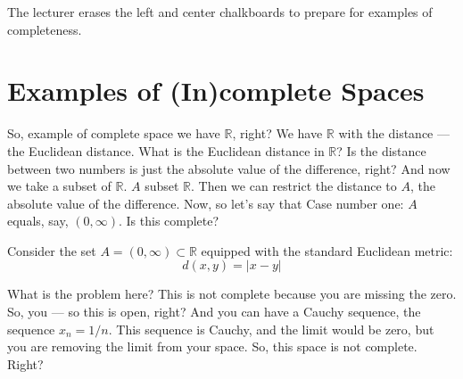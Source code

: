 \begin{meta-note}[Transition]
The lecturer erases the left and center chalkboards to prepare for examples of completeness.
\end{meta-note}

\section*{Examples of (In)complete Spaces}

\begin{spoken-clean}[00:04:05 - 00:05:24]
So, example of complete space we have $\mathbb{R}$, right? We have $\mathbb{R}$ with the distance --- the Euclidean distance.  What is the Euclidean distance in $\mathbb{R}$? Is the distance between two numbers is just the absolute value of the difference, right? And now we take a subset of $\mathbb{R}$. $A$ subset $\mathbb{R}$. Then we can restrict the distance to $A$, the absolute value of the difference. Now, so let's say that Case number one: $A$ equals, say, $(0, \infty)$. Is this complete?
\end{spoken-clean}

\begin{math-stroke}
Consider the set $A = (0, \infty) \subset \mathbb{R}$ equipped with the standard Euclidean metric:
\[ d(x, y) = |x - y| \]
\begin{center}
\end{center}
\end{math-stroke}

\begin{spoken-clean}[00:05:24 - 00:06:15]
What is the problem here? This is not complete because you are missing the zero. So, you --- so this is open, right? And you can have a Cauchy sequence, the sequence $x_n = 1/n$.  This sequence is Cauchy, and the limit would be zero, but you are removing the limit from your space. So, this space is not complete. Right?
\end{spoken-clean}

